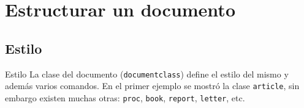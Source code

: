 \section{Estructurar un documento}
\frame{\tableofcontents[currentsection]}

\subsection{Estilo}
\begin{frame}[fragile]{Estilo}
La clase del documento (\texttt{documentclass}) define el estilo del
mismo y además varios comandos. En el primer ejemplo se mostró la clase
\texttt{article}, sin embargo existen muchas otras: \texttt{proc},
\texttt{book}, \texttt{report}, \texttt{letter}, etc.
\end{frame}

